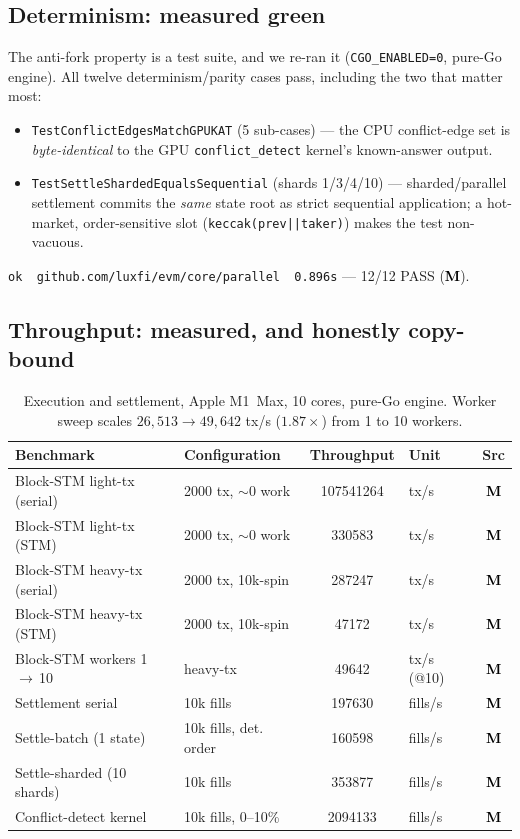 \documentclass[11pt,a4paper]{article}
\newcommand{\Mnow}{\textbf{\textcolor{black}{M}}}      %
\begin{document}
\subsection{Determinism: measured green}

The anti-fork property is a test suite, and we re-ran it
(\texttt{CGO\_ENABLED=0}, pure-Go engine). All twelve determinism/parity
cases pass, including the two that matter most:
\begin{itemize}[leftmargin=2em,itemsep=1pt]
  \item \texttt{TestConflictEdgesMatchGPUKAT} (5 sub-cases) --- the CPU
        conflict-edge set is \emph{byte-identical} to the GPU
        \texttt{conflict\_detect} kernel's known-answer output.
  \item \texttt{TestSettleShardedEqualsSequential} (shards
        1/3/4/10) --- sharded/parallel settlement commits the
        \emph{same} state root as strict sequential application; a
        hot-market, order-sensitive slot (\texttt{keccak(prev||taker)})
        makes the test non-vacuous.
\end{itemize}
\texttt{ok\ \ github.com/luxfi/evm/core/parallel\ \ 0.896s} --- 12/12
PASS (\Mnow).

\subsection{Throughput: measured, and honestly copy-bound}

\begin{table}[h]\centering\small
\begin{tabular}{@{}llS[table-format=7.0]l c@{}}
\toprule
Benchmark & Configuration & {Throughput} & Unit & Src \\
\midrule
Block-STM light-tx (serial) & 2000 tx, $\sim$0 work & 107541264 & tx/s & \Mnow \\
Block-STM light-tx (STM)    & 2000 tx, $\sim$0 work & 330583    & tx/s & \Mnow \\
Block-STM heavy-tx (serial) & 2000 tx, 10k-spin     & 287247    & tx/s & \Mnow \\
Block-STM heavy-tx (STM)    & 2000 tx, 10k-spin     & 47172     & tx/s & \Mnow \\
Block-STM workers 1\,$\to$\,10 & heavy-tx           & 49642     & tx/s (@10) & \Mnow \\
Settlement serial           & 10k fills             & 197630    & fills/s & \Mnow \\
Settle-batch (1 state)      & 10k fills, det. order & 160598    & fills/s & \Mnow \\
Settle-sharded (10 shards)  & 10k fills             & 353877    & fills/s & \Mnow \\
Conflict-detect kernel      & 10k fills, 0--10\%    & 2094133   & fills/s & \Mnow \\
\bottomrule
\end{tabular}
\caption{Execution and settlement, Apple M1~Max, 10 cores, pure-Go
engine. Worker sweep scales $26{,}513\!\to\!49{,}642$ tx/s
($1.87\times$) from 1 to 10 workers.}
\label{tab:l2}
\end{table}
\end{document}
